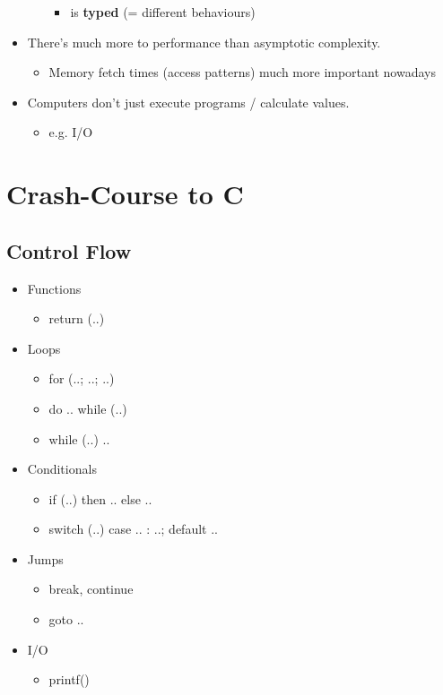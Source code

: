 \documentclass[12pt,a4paper]{article}
\begin{document}
\begin{itemize}
\begin{itemize}
\begin{itemize}
				\item is \textbf{typed} (= different behaviours)
			\end{itemize}
		\end{itemize}
	\item There's much more to performance than asymptotic complexity.
		\begin{itemize}
			\item Memory fetch times (access patterns) much more important nowadays
		\end{itemize}
	\item Computers don't just execute programs / calculate values.
		\begin{itemize}
			\item e.g. I/O
		\end{itemize}
\end{itemize}

\section{Crash-Course to C}
\subsection{Control Flow}
\begin{itemize}
	\item Functions
		\begin{itemize}
			\item return (..)
		\end{itemize}
	\item Loops
		\begin{itemize}
			\item for (..; ..; ..)
			\item do .. while (..)
			\item while (..) ..
		\end{itemize}
	\item Conditionals
		\begin{itemize}
			\item if (..) then .. else ..
			\item switch (..) case .. : ..; default ..
		\end{itemize}
	\item Jumps
		\begin{itemize}
			\item break, continue
			\item goto ..
		\end{itemize}
	\item I/O
		\begin{itemize}
			\item printf()
		\end{itemize}
\end{itemize}
\end{document}
